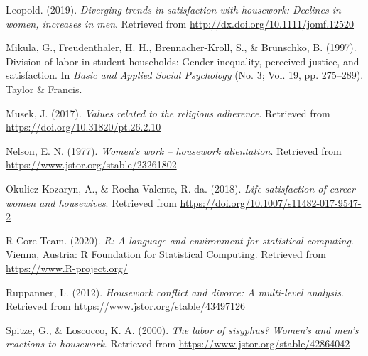 \documentclass[
  man,floatsintext]{apa6}
\newlength{\cslhangindent}
\newlength{\cslentryspacingunit} %
\newenvironment{CSLReferences}[2] %
 {%
  \setlength{\parindent}{0pt}
  \ifodd #1
  \let\oldpar\par
  \def\par{\hangindent=\cslhangindent\oldpar}
  \fi
  \setlength{\parskip}{#2\cslentryspacingunit}
 }%
 {}
\begin{document}
\begin{CSLReferences}{1}{0}
\leavevmode{}%
Leopold. (2019). \emph{Diverging trends in satisfaction with housework: Declines in women, increases in men}. Retrieved from \url{http://dx.doi.org/10.1111/jomf.12520}

\leavevmode{}%
Mikula, G., Freudenthaler, H. H., Brennacher-Kroll, S., \& Brunschko, B. (1997). Division of labor in student households: Gender inequality, perceived justice, and satisfaction. In \emph{Basic and Applied Social Psychology} (No. 3; Vol. 19, pp. 275--289). Taylor \& Francis.

\leavevmode{}%
Musek, J. (2017). \emph{Values related to the religious adherence}. Retrieved from \url{https://doi.org/10.31820/pt.26.2.10}

\leavevmode{}%
Nelson, E. N. (1977). \emph{Women's work -- housework alientation}. Retrieved from \url{https://www.jstor.org/stable/23261802}

\leavevmode{}%
Okulicz-Kozaryn, A., \& Rocha Valente, R. da. (2018). \emph{Life satisfaction of career women and housewives}. Retrieved from \url{https://doi.org/10.1007/s11482-017-9547-2}

\leavevmode{}%
R Core Team. (2020). \emph{R: A language and environment for statistical computing}. Vienna, Austria: R Foundation for Statistical Computing. Retrieved from \url{https://www.R-project.org/}

\leavevmode{}%
Ruppanner, L. (2012). \emph{Housework conflict and divorce: A multi-level analysis}. Retrieved from \url{https://www.jstor.org/stable/43497126}

\leavevmode{}%
Spitze, G., \& Loscocco, K. A. (2000). \emph{The labor of sisyphus? Women's and men's reactions to housework}. Retrieved from \url{https://www.jstor.org/stable/42864042}

\end{CSLReferences}


\clearpage
\renewcommand{\listfigurename}{Figure captions}

\clearpage
\renewcommand{\listtablename}{Table captions}
\end{document}
